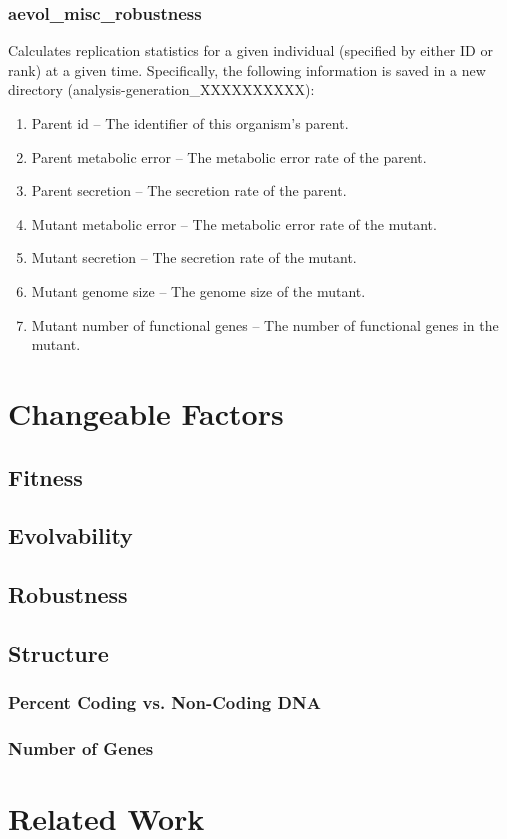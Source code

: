 \subsubsection{aevol\_misc\_robustness}

Calculates replication statistics for a given individual (specified by either ID or rank) at a given time.  Specifically, the following information is saved in a new directory (analysis-generation\_XXXXXXXXXX):
\begin{enumerate}
	\item Parent id – The identifier of this organism’s parent.
	\item Parent metabolic error – The metabolic error rate of the parent.
	\item Parent secretion – The secretion rate of the parent.
	\item Mutant metabolic error – The metabolic error rate of the mutant.
	\item Mutant secretion – The secretion rate of the mutant.
	\item Mutant genome size – The genome size of the mutant.
	\item Mutant number of functional genes – The number of functional genes in the mutant.
\end{enumerate}

\section{Changeable Factors}
\subsection{Fitness}
\subsection{Evolvability}
\subsection{Robustness}
\subsection{Structure}
\subsubsection{Percent Coding vs. Non-Coding DNA}
\subsubsection{Number of Genes}


\section{Related Work}\label{related_work}
